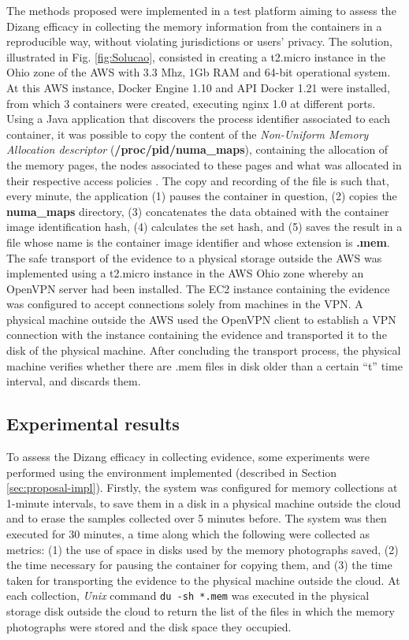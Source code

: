 \documentclass[conference]{IEEEtran}
\newcommand{\fancyname}{Dizang }
\begin{document}
The methods proposed were implemented in a test platform aiming to assess the \fancyname efficacy in collecting the memory information from the containers in a reproducible way, without violating jurisdictions or users’ privacy.
%
The solution, illustrated in Fig. \ref{fig:Solucao}, consisted in creating a t2.micro instance in the Ohio zone of the AWS with 3.3 Mhz, 1Gb RAM and 64-bit operational system. 
%
At this AWS instance, Docker Engine 1.10 and API Docker 1.21 were installed, from which 3 containers were created, executing nginx 1.0 at different ports. 
%
Using a Java application that discovers the process identifier associated to each container, it was possible to copy the content of the \textit{Non-Uniform Memory Allocation descriptor} (\textbf{/proc/pid/numa\_maps}), containing the allocation of the memory pages, the nodes associated to these pages and what was allocated in their respective access policies \cite{UnixManPages_numa_maps}.
%
The copy and recording of the file is such that, every minute, the application (1) pauses the container in question, (2) copies the \textbf{numa\_maps} directory, (3) concatenates the data obtained with the container image identification hash, (4) calculates the set hash, and (5) saves the result in a file whose name is the container image identifier and whose extension is \textbf{.mem}. 
%
The safe transport of the evidence to a physical storage outside the AWS was implemented using a t2.micro instance in the AWS Ohio zone whereby an OpenVPN server had been installed.
%
The EC2 instance containing the evidence was configured to accept connections solely from machines in the VPN.
%
A physical machine outside the AWS used the OpenVPN client to establish a VPN connection with the instance containing the evidence and transported it to the disk of the physical machine.
%
After concluding the transport process, the physical machine verifies whether there are .mem files in disk older than a certain “t” time interval, and discards them.
%

\subsection{Experimental results}
\label{sec:proposal-exp}

To assess the \fancyname efficacy in collecting evidence, some experiments were performed using the environment implemented (described in Section \ref{sec:proposal-impl}).
%
Firstly, the system was configured for memory collections at 1-minute intervals, to save them in a disk in a physical machine outside the cloud and to erase the samples collected over 5 minutes before. 
%
The system was then executed for 30 minutes, a time along which the following were collected as metrics: (1) the use of space in disks used by the memory photographs saved, (2) the time necessary for pausing the container for copying them, and (3) the time taken for transporting the evidence to the physical machine outside the cloud.
%
At each collection, \textit{Unix} command \texttt{du -sh *.mem} was executed in the physical storage disk outside the cloud to return the list of the files in which the memory photographs were stored and the disk space they occupied.
%
\end{document}
